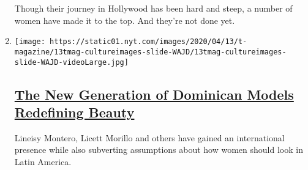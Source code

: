 \begin{enumerate}
  Though their journey in Hollywood has been hard and steep, a number of
  women have made it to the top. And they're not done yet.
\item
  \texttt{[image: https://static01.nyt.com/images/2020/04/13/t-magazine/13tmag-cultureimages-slide-WAJD/13tmag-cultureimages-slide-WAJD-videoLarge.jpg]}

  \hypertarget{the-new-generation-of-dominican-models-redefining-beauty}{%
  \subsection{\texorpdfstring{\href{/interactive/2020/04/13/t-magazine/dominican-republic-models.html}{The
  New Generation of Dominican Models Redefining
  Beauty}}{The New Generation of Dominican Models Redefining Beauty}}\label{the-new-generation-of-dominican-models-redefining-beauty}}

  Lineisy Montero, Licett Morillo and others have gained an
  international presence while also subverting assumptions about how
  women should look in Latin America.
\end{enumerate}


